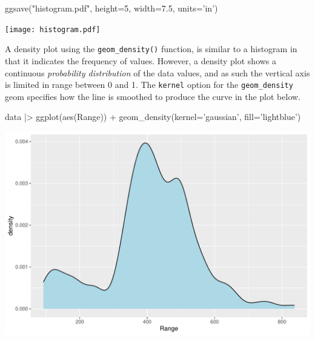 \begin{Rcode}
ggsave("histogram.pdf", height=5, width=7.5, units='in')
\end{Rcode}

\begin{center}
\texttt{[image: histogram.pdf]}
\end{center}

A density plot using the \texttt{geom\_density()} function, is similar to a histogram in that it indicates the frequency of values. However, a density plot shows a continuous \emph{probability distribution} of the data values, and as such the vertical axis is limited in range between 0 and 1. The \texttt{kernel} option for the \texttt{geom\_density} geom specifies how the line is smoothed to produce the curve in the plot below. 

\begin{Rcode}
data |> 
  ggplot(aes(Range)) + 
    geom_density(kernel='gaussian', fill='lightblue')
\end{Rcode}

\begin{center}
\includegraphics[width=.8\textwidth]{fuel.density.simple.pdf}
\end{center}


